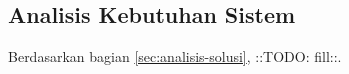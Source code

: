\subsection{Analisis Kebutuhan Sistem}
\label{sec:analisis-kebutuhan-sistem}

Berdasarkan bagian \ref{sec:analisis-solusi}, ::TODO: fill::.
